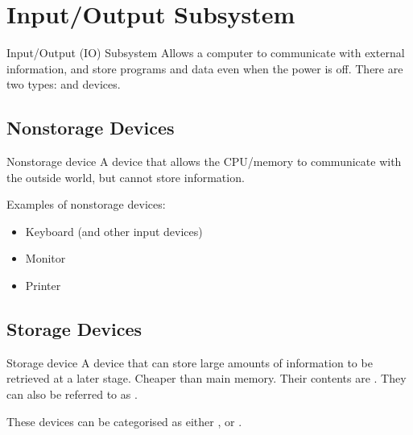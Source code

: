 \documentclass[\main/notes.tex]{subfiles}
\begin{document}
		\section{Input/Output Subsystem}
			\begin{definition}{Input/Output (IO) Subsystem}
				Allows a computer to communicate with external information, and store programs and data even when the power is off. There are two types:  and  devices.
			\end{definition}
			\subsection{Nonstorage Devices}
				\begin{definition}{Nonstorage device}
					A device that allows the CPU/memory to communicate with the outside world, but cannot store information.
				\end{definition}
				Examples of nonstorage devices:
				\begin{itemize}
					\item Keyboard (and other input devices)
					\item Monitor
					\item Printer
				\end{itemize}
			\subsection{Storage Devices}
				\begin{definition}{Storage device}
					A device that can store large amounts of information to be retrieved at a later stage. Cheaper than main memory. Their contents are . They can also be referred to as .
				\end{definition}
				These devices can be categorised as either , or .
\end{document}

